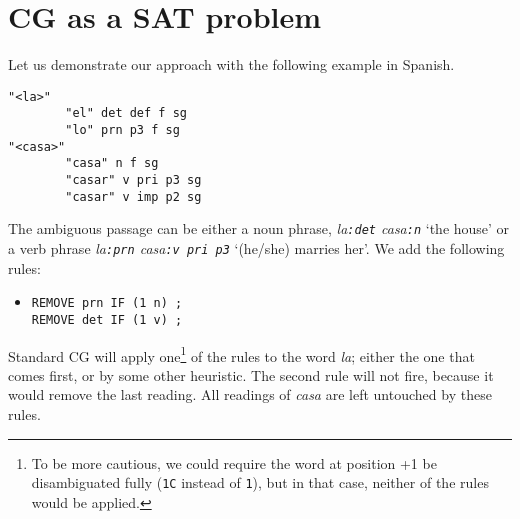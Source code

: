 \documentclass[11pt]{article}
\begin{document}




\section{CG as a SAT problem}
Let us demonstrate our approach with the following example in Spanish.

\begin{verbatim}
"<la>"
        "el" det def f sg
        "lo" prn p3 f sg
"<casa>"
        "casa" n f sg
        "casar" v pri p3 sg
        "casar" v imp p2 sg
\end{verbatim}

The ambiguous passage can be either a noun phrase, \emph{la\texttt{:det} casa\texttt{:n}} 
`the house'  or a verb phrase \emph{la\texttt{:prn} casa\texttt{:v pri p3}} `(he/she) marries her'. 
We add the following rules:

\begin{itemize}
\item [] \texttt{REMOVE prn IF (1 n) ;} \\
             \texttt{REMOVE det IF (1 v) ;}
\end{itemize}

Standard CG will apply one\footnote{To be more cautious, we could require the word at position +1 be disambiguated fully (\texttt{1C} instead of \texttt{1}), but in that case, 
neither of the rules would be applied.} of the rules to the word \emph{la}; 
either the one that comes first, or by some other heuristic. 
The second rule will not fire, because it would remove the last reading. 
All readings of \emph{casa} are left untouched by these rules.
\end{document}
